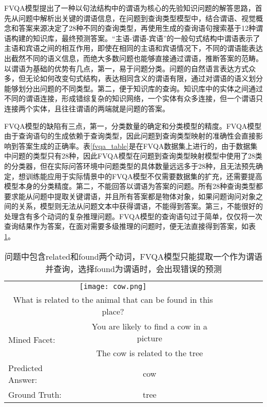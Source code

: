 FVQA模型提出了一种以句法结构中的谓语为核心的先验知识问题的解答思路，首先从问题中解析出关键的谓语信息，在问题到查询类型模型中，结合谓语、视觉概念和答案来源决定了28种不同的查询类型，再使用生成的查询语句搜索基于12种谓语构建的知识库，最终预测答案。“主语-谓语-宾语”的一般句式结构中谓语表示了主语和宾语之间的相互作用，即使在相同的主语和宾语情况下，不同的谓语能表达出截然不同的语义信息，而绝大多数问题也能够直接通过谓语，推断答案的范畴。以谓语为基础的优势有几点，第一，易于问题分类。问题的自然语言表达方式众多，但无论如何改变句式结构，表达相同含义的谓语有限，通过对谓语的语义划分能够划分出问题的不同类型。第二，便于知识库的查询。知识库中的实体之间通过不同的谓语连接，形成错综复杂的知识网络，一个实体有众多连接，但一个谓语只连接两个实体，且往往谓语的两端就是问题的答案。

FVQA模型的缺陷有三点，第一，分类数量的确定和分类模型的精度。FVQA模型由于查询语句的生成依赖于查询类型，因此问题到查询类型映射的准确性会直接影响到答案生成的正确率。表\ref{fvqa_table}是在FVQA数据集上进行的，由于数据集中问题的类型只有28种，因此FVQA模型在问题到查询类型映射模型中使用了28类的分类器，但在实际问答环境中问题类型的具体数量远远多于28种，且无法预先确定，想训练能应用于实际情景中的FVQA模型不仅需要数据集的扩充，还需要提高模型本身的分类精度。第二，不能回答以谓语为答案的问题。所有28种查询类型都要求能从问题中提取关键谓语，并且所有答案都是物体对象，如果问题询问对象之间的关系，模型则无法从问题文本中获得谓语，不能得到答案。第三，不能很好的处理含有多个动词的复杂推理问题。FVQA模型的查询语句过于简单，仅仅将一次查询结果作为答案，在面对需要多级推理的问题时，便无法直接得到答案，如表\ref{fvqa_wrong}。
\begin{table}[H]
\centering
\begin{tabular}{lcccccc}
\toprule
\multicolumn{2}{c}{\texttt{[image: cow.png]}} \\
\multicolumn{2}{c}{What is related to the animal that can be found in this place?} \\
\midrule
\multirow{2}{*}{Mined Facet:} & You are likely to find a cow in a picture \\
 & The cow is related to the tree \\
Predicted Answer: & cow \\
Ground Truth: & tree \\
\bottomrule
\end{tabular}
\caption{问题中包含related和found两个动词，FVQA模型只能提取一个作为谓语并查询，选择found为谓语时，会出现错误的预测}
\label{fvqa_wrong}
\end{table}

